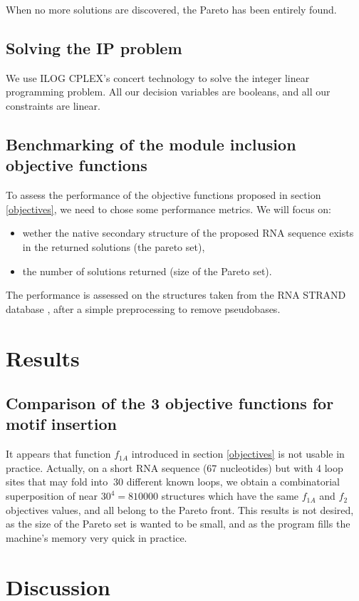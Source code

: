 \documentclass{article}
\begin{document}
When no more solutions are discovered, the Pareto has been entirely found.

\subsection{Solving the IP problem}
We use ILOG CPLEX's \cite{cplex} concert technology to solve the integer linear programming problem. All our decision variables are booleans, and all our constraints are linear.

\subsection{Benchmarking of the module inclusion objective functions}
To assess the performance of the objective functions proposed in section \ref{objectives}, we need to chose some performance metrics.
We will focus on:
\begin{itemize}
	\item wether the native secondary structure of the proposed RNA sequence exists in the returned solutions (the pareto set),
	\item the number of solutions returned (size of the Pareto set).
\end{itemize}

The performance is assessed on the structures taken from the RNA STRAND database \cite{andronescu2008rna}, after a simple preprocessing to remove pseudobases.

\section{Results \label{results}}
\subsection{Comparison of the 3 objective functions for motif insertion}
It appears that function $f_{1A}$ introduced in section \ref{objectives} is not usable in practice.
Actually, on a short RNA sequence (67 nucleotides) but with 4 loop sites that may fold into $~30$ different known loops, 
we obtain a combinatorial superposition of near $30^4 = 810 000$ structures which have the same $f_{1A}$ and $f_2$ objectives values, and 
all belong to the Pareto front. This results is not desired, as the size of the Pareto set is wanted to be small, and as the program fills the machine's memory very quick in practice.

\section{Discussion \label{discussion}}




\end{document}
